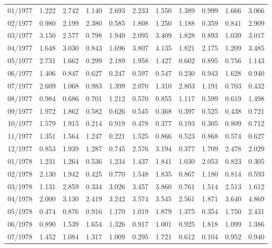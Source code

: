 \begin{tabular}{lrrrrrrrrrr}
01/1977 &  1.222 &  2.742 &  1.140 &  2.693 &  2.233 &  1.550 &  1.389 &  0.999 &  1.666 &  3.066 \\
02/1977 &  0.980 &  2.199 &  2.380 &  0.585 &  1.808 &  1.250 &  1.188 &  0.359 &  0.841 &  2.909 \\
03/1977 &  3.150 &  2.577 &  0.798 &  1.940 &  2.095 &  3.409 &  1.828 &  0.893 &  1.039 &  3.017 \\
04/1977 &  1.648 &  3.030 &  0.843 &  1.696 &  3.807 &  4.135 &  1.821 &  2.175 &  1.209 &  3.485 \\
05/1977 &  2.731 &  1.662 &  0.299 &  2.189 &  1.958 &  1.427 &  0.602 &  0.895 &  0.756 &  1.143 \\
06/1977 &  1.406 &  0.847 &  0.627 &  0.247 &  0.597 &  0.547 &  0.230 &  0.943 &  1.628 &  0.940 \\
07/1977 &  2.609 &  1.068 &  0.983 &  1.399 &  2.070 &  1.310 &  2.803 &  1.191 &  0.703 &  0.432 \\
08/1977 &  0.984 &  0.686 &  0.701 &  1.212 &  0.570 &  0.855 &  1.117 &  0.599 &  0.619 &  1.498 \\
09/1977 &  1.972 &  1.862 &  0.582 &  0.626 &  0.545 &  0.368 &  0.397 &  0.525 &  0.438 &  0.721 \\
10/1977 &  1.579 &  1.915 &  0.214 &  0.919 &  0.478 &  0.377 &  0.193 &  0.305 &  0.809 &  0.712 \\
11/1977 &  1.351 &  1.564 &  1.247 &  0.221 &  1.525 &  0.866 &  0.523 &  0.868 &  0.574 &  0.627 \\
12/1977 &  0.853 &  1.939 &  1.287 &  0.745 &  2.576 &  3.194 &  0.377 &  1.709 &  2.478 &  2.029 \\
01/1978 &  1.231 &  1.264 &  0.536 &  1.234 &  1.437 &  1.841 &  1.030 &  2.053 &  0.823 &  0.305 \\
02/1978 &  2.130 &  1.942 &  0.425 &  0.770 &  1.548 &  1.835 &  0.867 &  1.180 &  0.814 &  0.593 \\
03/1978 &  1.131 &  2.859 &  0.334 &  3.026 &  3.457 &  3.860 &  0.761 &  1.514 &  2.513 &  1.612 \\
04/1978 &  2.000 &  3.130 &  2.419 &  3.242 &  3.574 &  3.545 &  2.561 &  1.871 &  3.640 &  4.869 \\
05/1978 &  0.474 &  0.876 &  0.916 &  1.170 &  1.019 &  1.879 &  1.375 &  0.354 &  1.750 &  2.431 \\
06/1978 &  0.890 &  1.539 &  1.654 &  1.326 &  0.917 &  1.001 &  0.925 &  1.818 &  1.099 &  1.386 \\
07/1978 &  1.452 &  1.084 &  1.317 &  1.009 &  0.295 &  1.721 &  0.612 &  0.104 &  0.952 &  0.940 \\

\end{tabular}

